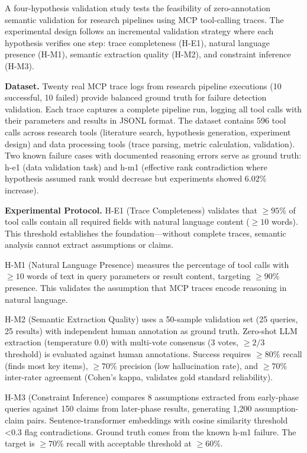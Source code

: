 
A four-hypothesis validation study tests the feasibility of zero-annotation semantic validation for research pipelines using MCP tool-calling traces. The experimental design follows an incremental validation strategy where each hypothesis verifies one step: trace completeness (H-E1), natural language presence (H-M1), semantic extraction quality (H-M2), and constraint inference (H-M3).

\textbf{Dataset.} Twenty real MCP trace logs from research pipeline executions (10 successful, 10 failed) provide balanced ground truth for failure detection validation. Each trace captures a complete pipeline run, logging all tool calls with their parameters and results in JSONL format. The dataset contains 596 tool calls across research tools (literature search, hypothesis generation, experiment design) and data processing tools (trace parsing, metric calculation, validation). Two known failure cases with documented reasoning errors serve as ground truth: h-e1 (data validation task) and h-m1 (effective rank contradiction where hypothesis assumed rank would decrease but experiments showed 6.02\% increase).

\textbf{Experimental Protocol.} H-E1 (Trace Completeness) validates that $\geq 95$\% of tool calls contain all required fields with natural language content ($\geq 10$ words). This threshold establishes the foundation---without complete traces, semantic analysis cannot extract assumptions or claims.

H-M1 (Natural Language Presence) measures the percentage of tool calls with $\geq 10$ words of text in query parameters or result content, targeting $\geq 90$\% presence. This validates the assumption that MCP traces encode reasoning in natural language.

H-M2 (Semantic Extraction Quality) uses a 50-sample validation set (25 queries, 25 results) with independent human annotation as ground truth. Zero-shot LLM extraction (temperature 0.0) with multi-vote consensus (3 votes, $\geq 2/3$ threshold) is evaluated against human annotations. Success requires $\geq 80$\% recall (finds most key items), $\geq 70$\% precision (low hallucination rate), and $\geq 70$\% inter-rater agreement (Cohen's kappa, validates gold standard reliability).

H-M3 (Constraint Inference) compares 8 assumptions extracted from early-phase queries against 150 claims from later-phase results, generating 1,200 assumption-claim pairs. Sentence-transformer embeddings with cosine similarity threshold <0.3 flag contradictions. Ground truth comes from the known h-m1 failure. The target is $\geq 70$\% recall with acceptable threshold at $\geq 60$\%.

